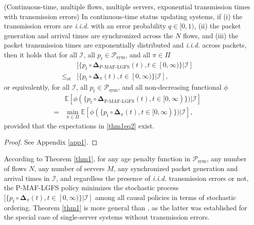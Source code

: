 \begin{theorem}(Continuous-time, multiple flows, multiple servers, exponential transmission times with transmission errors)\label{thm1}
In continuous-time status updating systems, if (i) the transmission errors are \emph{i.i.d.} with an error probability $q \in [0, 1)$, (ii)  the packet generation and arrival times are {synchronized} across the $N$ flows, and (iii)  the packet transmission times are exponentially distributed and \emph{i.i.d.} across packets, then it holds that for all $\mathcal{I}$, all $p_t \in\mathcal{P}_{\text{sym}}$, and all $\pi\in\Pi$ 
\begin{align}\label{thm1eq1}
&[\{p_t \circ\bm{\Delta}_{\text{P-MAF-LGFS}}(t), t\in [0,\infty)\}\vert\mathcal{I}] \nonumber\\
\leq_{\text{st}} & [\{p_t \circ\bm{\Delta}_\pi(t), t\in [0,\infty)\}\vert\mathcal{I}],
\end{align}
or equivalently, for all $\mathcal{I}$, all $p_t \in\mathcal{P}_{\text{sym}}$, and all non-decreasing functional $\phi$
 \begin{align}\label{thm1eq2}
&\mathbb{E}\left[\phi (\{p_t \circ\bm{\Delta}_{\text{P-MAF-LGFS}}(t),t\in [0,\infty)\})\vert\mathcal{I}\right] \nonumber\\
= & \min_{\pi\in\Pi} \mathbb{E}\left[\phi (\{p_t \circ\bm{\Delta}_\pi(t),t\in [0,\infty)\})\vert\mathcal{I}\right],
\end{align}
provided that the expectations in \eqref{thm1eq2} exist.
\end{theorem}
\begin{proof}

See Appendix \ref{app1}.  \end{proof}



According to Theorem \ref{thm1}, for any age penalty function in $\mathcal{P}_{\text{sym}}$, any number of flows  $N$, any number of servers $M$,  any synchronized packet generation and arrival times in $\mathcal{I}$, and regardless the presence of \emph{i.i.d.} transmission errors or not,
the P-MAF-LGFS policy minimizes the stochastic process $[\{p_t \circ\bm{\Delta}_\pi(t), t\in [0,\infty)\}|\mathcal{I}]$ among all causal policies  in terms of stochastic ordering. Theorem \ref{thm1} is more general than \cite[Theorem 1]{SunAoIWorkshop2018}, as the latter was established for the special case of single-server systems without transmission errors. 




